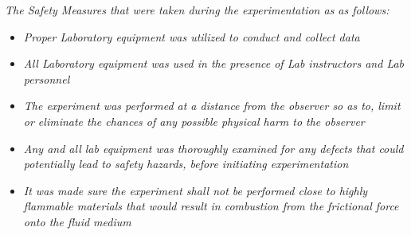 

\textit{The Safety Measures that were taken during the experimentation as as follows:}

	\begin{itemize}
		\item \textit{Proper Laboratory equipment was utilized to conduct and collect data}
		\item \textit{All Laboratory equipment was used in the presence of Lab instructors and Lab personnel}
		\item \textit{The experiment was performed at a distance from the observer so as to, limit or eliminate the chances of any possible physical harm to the observer}
		\item \textit{Any and all lab equipment was thoroughly examined for any defects that could potentially lead to safety hazards, before initiating experimentation}
		\item \textit{It was made sure the experiment shall not be performed close to highly flammable materials that would result in combustion from the frictional force onto the fluid medium}
	\end{itemize}

